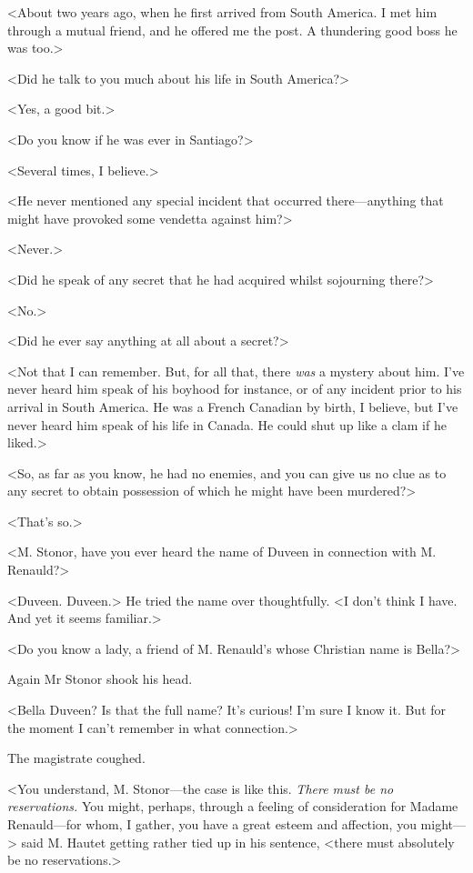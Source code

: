  <About two years ago, when he first arrived from South America. I met him through a mutual friend, and he offered me the post. A thundering good boss he was too.> 

 <Did he talk to you much about his life in South America?> 

 <Yes, a good bit.> 

 <Do you know if he was ever in Santiago?> 

 <Several times, I believe.> 

 <He never mentioned any special incident that occurred there—anything that might have provoked some vendetta against him?> 

 <Never.> 

 <Did he speak of any secret that he had acquired whilst sojourning there?> 

 <No.> 

 <Did he ever say anything at all about a secret?> 

 <Not that I can remember. But, for all that, there \emph{was} a mystery about him. I've never heard him speak of his boyhood for instance, or of any incident prior to his arrival in South America. He was a French Canadian by birth, I believe, but I've never heard him speak of his life in Canada. He could shut up like a clam if he liked.> 

 <So, as far as you know, he had no enemies, and you can give us no clue as to any secret to obtain possession of which he might have been murdered?> 

 <That's so.> 

 <M. Stonor, have you ever heard the name of Duveen in connection with M. Renauld?> 

 <Duveen. Duveen.> He tried the name over thoughtfully. <I don't think I have. And yet it seems familiar.> 

 <Do you know a lady, a friend of M. Renauld's whose Christian name is Bella?> 

 Again Mr Stonor shook his head. 

 <Bella Duveen? Is that the full name? It's curious! I'm sure I know it. But for the moment I can't remember in what connection.> 

 The magistrate coughed. 

 <You understand, M. Stonor—the case is like this. \emph{There must be no reservations.} You might, perhaps, through a feeling of consideration for Madame Renauld—for whom, I gather, you have a great esteem and affection, you might—> said M. Hautet getting rather tied up in his sentence, <there must absolutely be no reservations.> 

